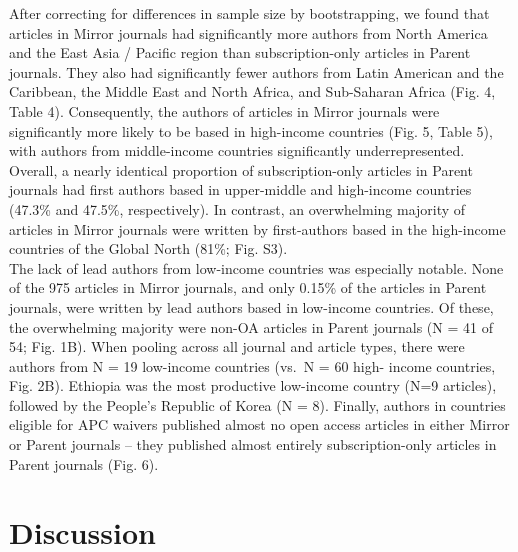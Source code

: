 \documentclass[
  english,
  man]{apa6}
\begin{document}
After correcting for differences in sample size by bootstrapping, we found that articles in Mirror journals had significantly more authors from North America and the East Asia / Pacific region than subscription-only articles in Parent journals. They also had significantly fewer authors from Latin American and the Caribbean, the Middle East and North Africa, and Sub-Saharan Africa (Fig. 4, Table 4). Consequently, the authors of articles in Mirror journals were significantly more likely to be based in high-income countries (Fig. 5, Table 5), with authors from middle-income countries significantly underrepresented. Overall, a nearly identical proportion of subscription-only articles in Parent journals had first authors based in upper-middle and high-income countries (47.3\% and 47.5\%, respectively). In contrast, an overwhelming majority of articles in Mirror journals were written by first-authors based in the high-income countries of the Global North (81\%; Fig. S3).\\
The lack of lead authors from low-income countries was especially notable. None of the 975 articles in Mirror journals, and only 0.15\% of the articles in Parent journals, were written by lead authors based in low-income countries. Of these, the overwhelming majority were non-OA articles in Parent journals (N = 41 of 54; Fig. 1B). When pooling across all journal and article types, there were authors from N = 19 low-income countries (vs.~N = 60 high- income countries, Fig. 2B). Ethiopia was the most productive low-income country (N=9 articles), followed by the People's Republic of Korea (N = 8). Finally, authors in countries eligible for APC waivers published almost no open access articles in either Mirror or Parent journals -- they published almost entirely subscription-only articles in Parent journals (Fig. 6).\\

\hypertarget{discussion}{%
\section{Discussion}\label{discussion}}
\end{document}
